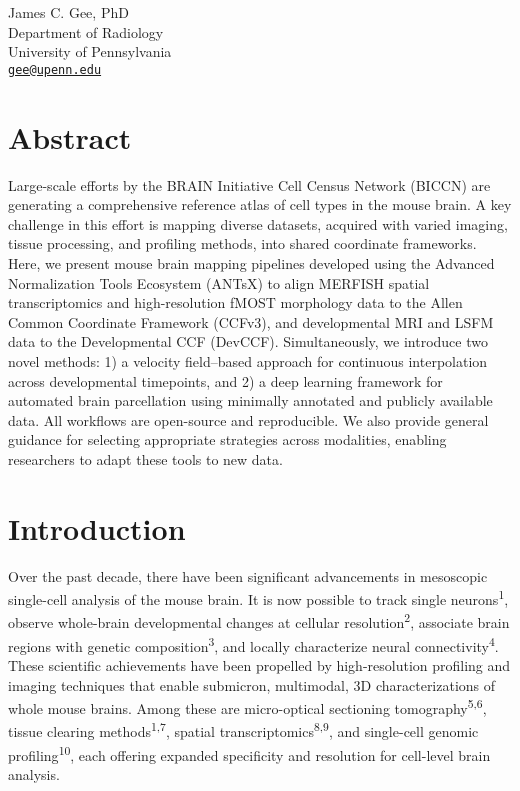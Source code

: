 \documentclass[
  12pt,
]{article}
\begin{document}
James C. Gee, PhD\\
Department of Radiology\\
University of Pennsylvania\\
\href{mailto:gee@upenn.edu}{\nolinkurl{gee@upenn.edu}}

\normalsize

\newpage


\section*{Abstract}\label{abstract}

Large-scale efforts by the BRAIN Initiative Cell Census Network (BICCN)
are generating a comprehensive reference atlas of cell types in the
mouse brain. A key challenge in this effort is mapping diverse datasets,
acquired with varied imaging, tissue processing, and profiling methods,
into shared coordinate frameworks. Here, we present mouse brain mapping
pipelines developed using the Advanced Normalization Tools Ecosystem
(ANTsX) to align MERFISH spatial transcriptomics and high-resolution
fMOST morphology data to the Allen Common Coordinate Framework (CCFv3),
and developmental MRI and LSFM data to the Developmental CCF (DevCCF).
Simultaneously, we introduce two novel methods: 1) a velocity
field--based approach for continuous interpolation across developmental
timepoints, and 2) a deep learning framework for automated brain
parcellation using minimally annotated and publicly available data. All
workflows are open-source and reproducible. We also provide general
guidance for selecting appropriate strategies across modalities,
enabling researchers to adapt these tools to new data.

\clearpage

\section{Introduction}\label{introduction}

Over the past decade, there have been significant advancements in
mesoscopic single-cell analysis of the mouse brain. It is now possible
to track single neurons\textsuperscript{1}, observe whole-brain
developmental changes at cellular resolution\textsuperscript{2},
associate brain regions with genetic composition\textsuperscript{3}, and
locally characterize neural connectivity\textsuperscript{4}. These
scientific achievements have been propelled by high-resolution profiling
and imaging techniques that enable submicron, multimodal, 3D
characterizations of whole mouse brains. Among these are micro-optical
sectioning tomography\textsuperscript{5,6}, tissue clearing
methods\textsuperscript{1,7}, spatial
transcriptomics\textsuperscript{8,9}, and single-cell genomic
profiling\textsuperscript{10}, each offering expanded specificity and
resolution for cell-level brain analysis.
\end{document}
